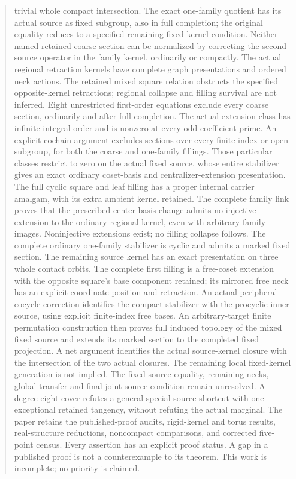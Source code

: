 \documentclass[11pt,a4paper]{article}
\begin{document}
\begin{abstract}
trivial whole compact intersection. The exact one-family quotient has
its actual source as fixed subgroup, also in full completion; the
original equality reduces to a specified remaining fixed-kernel
condition. Neither named retained coarse section can be normalized by
correcting the second source operator in the family kernel, ordinarily
or compactly. The actual regional retraction kernels have complete
graph presentations and ordered neck actions. The retained mixed square
relation obstructs the specified opposite-kernel retractions; regional
collapse and filling survival are not inferred. Eight unrestricted first-order
equations exclude every coarse section, ordinarily and after full
completion. The actual extension class has infinite integral order and
is nonzero at every odd coefficient prime. An explicit cochain argument
excludes sections over every finite-index or open subgroup, for both
the coarse and one-family fillings. Those particular classes restrict
to zero on the actual fixed source, whose entire stabilizer gives an
exact ordinary coset-basis and centralizer-extension presentation.
The full cyclic square and leaf filling has a proper internal carrier
amalgam, with its extra ambient kernel retained. The complete family
link proves that the prescribed center-basis change admits no injective
extension to the ordinary regional kernel, even with arbitrary family
images. Noninjective extensions exist; no filling collapse follows. The complete ordinary
one-family stabilizer is cyclic and admits a marked fixed section.
The remaining source kernel has an exact presentation on three whole
contact orbits. The complete first filling is a free-coset extension
with the opposite square's base component retained; its mirrored free
neck has an explicit coordinate position and retraction. An actual
peripheral-cocycle correction identifies the compact stabilizer with
the procyclic inner source, using explicit finite-index free bases.
An arbitrary-target finite permutation construction then proves full
induced topology of the mixed fixed source and extends its marked
section to the completed fixed projection. A net argument identifies
the actual source-kernel closure with the intersection of the two
actual closures. The remaining local fixed-kernel generation is not
implied.
The fixed-source equality, remaining necks, global transfer and final
joint-source condition remain unresolved. A degree-eight cover refutes
a general special-source shortcut with one exceptional retained
tangency, without refuting the actual marginal. The paper retains the published-proof audits, rigid-kernel
and torus results, real-structure reductions, noncompact comparisons,
and corrected five-point census. Every assertion has an explicit proof
status. A gap in a published proof is not a counterexample to its theorem.
This work is incomplete; no priority is claimed.
\end{abstract}
\tableofcontents
\clearpage
\end{document}
